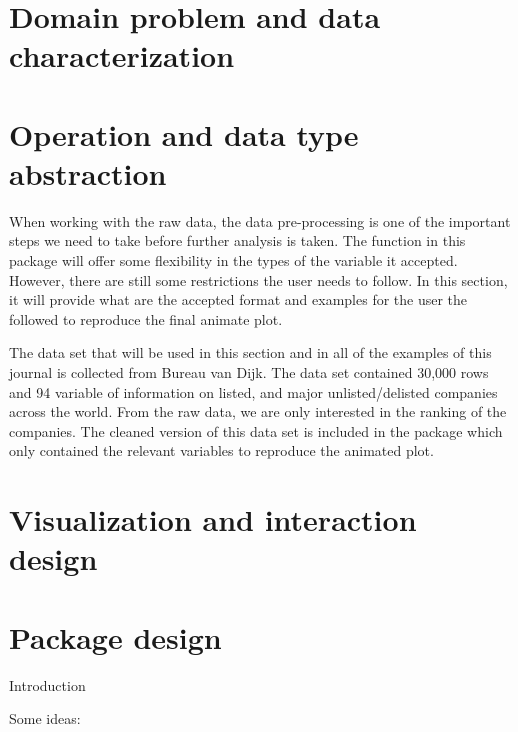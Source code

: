 \hypertarget{domain-problem-and-data-characterization}{%
\section{Domain problem and data characterization}\label{domain-problem-and-data-characterization}}

\hypertarget{operation-and-data-type-abstraction}{%
\section{Operation and data type abstraction}\label{operation-and-data-type-abstraction}}

When working with the raw data, the data pre-processing is one of the important steps we need to take before further analysis is taken. The function in this package will offer some flexibility in the types of the variable it accepted. However, there are still some restrictions the user needs to follow. In this section, it will provide what are the accepted format and examples for the user the followed to reproduce the final animate plot.

The data set that will be used in this section and in all of the examples of this journal is collected from Bureau van Dijk. The data set contained 30,000 rows and 94 variable of information on listed, and major unlisted/delisted companies across the world. From the raw data, we are only interested in the ranking of the companies. The cleaned version of this data set is included in the package which only contained the relevant variables to reproduce the animated plot.

\hypertarget{visualization-and-interaction-design}{%
\section{Visualization and interaction design}\label{visualization-and-interaction-design}}

\hypertarget{package-design}{%
\section{Package design}\label{package-design}}

Introduction

Some ideas:

